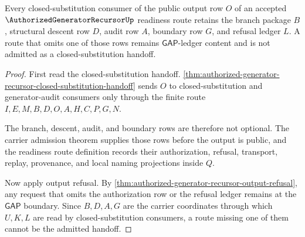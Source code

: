 \begin{theorem}
\label{thm:authorized-generator-recursor-closed-substitution-admission}
Every closed-substitution consumer of the public output row $O$ of an accepted $\AuthorizedGeneratorRecursorUp$ readiness route retains the branch package $B$, structural descent row $D$, audit row $A$, boundary row $G$, and refusal ledger $L$. A route that omits one of those rows remains $\mathsf{GAP}$-ledger content and is not admitted as a closed-substitution handoff.
\end{theorem}
\begin{proof}
First read the closed-substitution handoff. \autoref{thm:authorized-generator-recursor-closed-substitution-handoff} sends $O$ to closed-substitution and generator-audit consumers only through the finite route $I,E,M,B,D,O,A,H,C,P,G,N$.

The branch, descent, audit, and boundary rows are therefore not optional. The carrier admission theorem supplies those rows before the output is public, and the readiness route definition records their authorization, refusal, transport, replay, provenance, and local naming projections inside $Q$.

Now apply output refusal. By \autoref{thm:authorized-generator-recursor-output-refusal}, any request that omits the authorization row or the refusal ledger remains at the $\mathsf{GAP}$ boundary. Since $B,D,A,G$ are the carrier coordinates through which $U,K,L$ are read by closed-substitution consumers, a route missing one of them cannot be the admitted handoff.
\end{proof}

